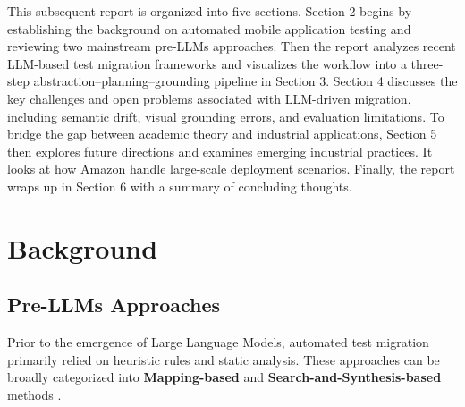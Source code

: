 \documentclass[acmsmall,nonacm]{acmart}
\begin{document}
This subsequent report is organized into five sections. Section 2 begins by establishing the background on automated mobile application testing and reviewing two mainstream pre-LLMs approaches. Then the report analyzes recent LLM-based test migration frameworks and visualizes the workflow into a three-step abstraction–planning–grounding pipeline in Section 3. Section 4 discusses the key challenges and open problems associated with LLM-driven migration, including semantic drift, visual grounding errors, and evaluation limitations. To bridge the gap between academic theory and industrial applications, Section 5 then explores future directions and examines emerging industrial practices. It looks at how Amazon handle large-scale deployment scenarios. Finally, the report wraps up in Section 6 with a summary of concluding thoughts.



\section{Background}

\subsection{Pre-LLMs Approaches}
Prior to the emergence of Large Language Models, automated test migration primarily relied on heuristic rules and static analysis. These approaches can be broadly categorized into \textbf{Mapping-based} \cite{li2025reusedroidvlmempoweredandroidui} and \textbf{Search-and-Synthesis-based} methods \cite{10.1145/3650212.3680327}.
\end{document}
